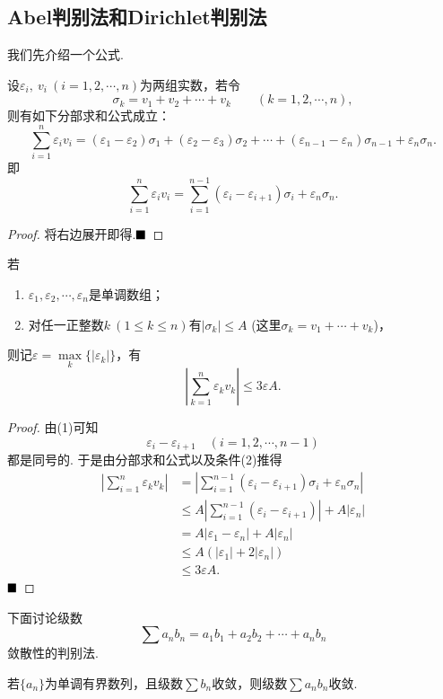 \subsection{Abel判别法和Dirichlet判别法}
我们先介绍一个公式.
\begin{lemma}
	设$\varepsilon_i,\ v_i\ (i=1,2,\cdots,n)$为两组实数，若令
	$$\sigma_k=v_1+v_2+\cdots+v_k\qquad(k=1,2,\cdots,n),$$
	则有如下分部求和公式成立：
	$$\sum_{i=1}^{n}\varepsilon_iv_i=(\varepsilon_1-\varepsilon_2)\sigma_1+(\varepsilon_2-\varepsilon_3)\sigma_2+\cdots+(\varepsilon_{n-1}-\varepsilon_n)\sigma_{n-1}+\varepsilon_n\sigma_n.$$
	即
	$$\sum_{i=1}^{n}\varepsilon_iv_i=\sum_{i=1}^{n-1}(\varepsilon_i-\varepsilon_{i+1})\sigma_i+\varepsilon_n\sigma_n.$$
\end{lemma}
\begin{proof}
	将右边展开即得.$\hfill\blacksquare$
\end{proof}
\begin{lemma}[Abel引理]
	若
	\begin{enumerate}[(1)]
		\item $\varepsilon_1,\varepsilon_2,\cdots,\varepsilon_n$是单调数组；
		\item 对任一正整数$k\ (1\leqslant k\leqslant n)$有$|\sigma_k|\leqslant A$ (这里$\sigma_k=v_1+\cdots+v_k$)， 
	\end{enumerate}
	则记$\varepsilon=\max\limits_k\{|\varepsilon_k|\}$，有
	$$\left|\sum_{k=1}^{n}\varepsilon_kv_k\right|\leqslant 3\varepsilon A.$$
\end{lemma}
\begin{proof}
	由(1)可知
	$$\varepsilon_i-\varepsilon_{i+1}\quad (i=1,2,\cdots,n-1)$$
	都是同号的. 于是由分部求和公式以及条件(2)推得
	\begin{align*}
		\left|\sum_{i=1}^{n}\varepsilon_kv_k\right|
		&=\left|\sum_{i=1}^{n-1}(\varepsilon_i-\varepsilon_{i+1})\sigma_i+\varepsilon_n\sigma_n\right|\\
		&\leqslant A\left|\sum_{i=1}^{n-1}(\varepsilon_i-\varepsilon_{i+1})\right|+A|\varepsilon_n|\\
		&=A|\varepsilon_1-\varepsilon_n|+A|\varepsilon_n|\\
		&\leqslant A(|\varepsilon_1|+2|\varepsilon_n|)\\
		&\leqslant 3\varepsilon A.
	\end{align*}
	$\hfill\blacksquare$
\end{proof}
下面讨论级数
$$\sum a_nb_n=a_1b_1+a_2b_2+\cdots+a_nb_n$$
敛散性的判别法.
\begin{theorem}[Abel判别法]
	若$\{a_n\}$为单调有界数列，且级数$\sum b_n$收敛，则级数$\sum a_nb_n$收敛.
\end{theorem}
